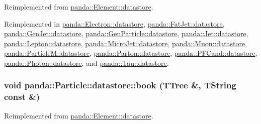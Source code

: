 Reimplemented from \hyperlink{structpanda_1_1Element_1_1datastore_a0397350c92ee5cbf2d16cf66fc701afa}{panda::Element::datastore}.

Reimplemented in \hyperlink{structpanda_1_1Electron_1_1datastore_a3e84b684132c59a589f7a041cae61507}{panda::Electron::datastore}, \hyperlink{structpanda_1_1FatJet_1_1datastore_a5df5d3f7ed3b3d1d70f99dcb6a9c25e4}{panda::FatJet::datastore}, \hyperlink{structpanda_1_1GenJet_1_1datastore_a8b05278d242cae6efa7c1cc2ed929d6a}{panda::GenJet::datastore}, \hyperlink{structpanda_1_1GenParticle_1_1datastore_a431a6d40dc4affce7107d9368d2932a9}{panda::GenParticle::datastore}, \hyperlink{structpanda_1_1Jet_1_1datastore_a899f59963d18c2c13019d9ed27eb7745}{panda::Jet::datastore}, \hyperlink{structpanda_1_1Lepton_1_1datastore_a109ac02caed6e0a69a1b00248d80500e}{panda::Lepton::datastore}, \hyperlink{structpanda_1_1MicroJet_1_1datastore_a09aae2ebbbda55c6616b6a693f43bb66}{panda::MicroJet::datastore}, \hyperlink{structpanda_1_1Muon_1_1datastore_a6845ee992e7f6f23a4f159b97411bfc6}{panda::Muon::datastore}, \hyperlink{structpanda_1_1ParticleM_1_1datastore_aafc17a88cf8425ff45a00b5fd2eb5751}{panda::ParticleM::datastore}, \hyperlink{structpanda_1_1Parton_1_1datastore_ab13044f2228c663b73a6e24f0967a445}{panda::Parton::datastore}, \hyperlink{structpanda_1_1PFCand_1_1datastore_af5aef7147e657b4f1b4125f3dae0dc39}{panda::PFCand::datastore}, \hyperlink{structpanda_1_1Photon_1_1datastore_aafdc384cc9e57f60b6acecb3ad82fdb2}{panda::Photon::datastore}, and \hyperlink{structpanda_1_1Tau_1_1datastore_a6f817076ea4ed71fc8b66c70a834b39d}{panda::Tau::datastore}.\hypertarget{structpanda_1_1Particle_1_1datastore_af75a5d8b8a18ee09ce98ab37888b4404}{
\subsubsection[{book}]{\setlength{\rightskip}{0pt plus 5cm}void panda::Particle::datastore::book (TTree \&, \/  TString const \&)}}
\label{structpanda_1_1Particle_1_1datastore_af75a5d8b8a18ee09ce98ab37888b4404}


Reimplemented from \hyperlink{structpanda_1_1Element_1_1datastore_a2e677f904aee6a53452674b83bea49e4}{panda::Element::datastore}.

